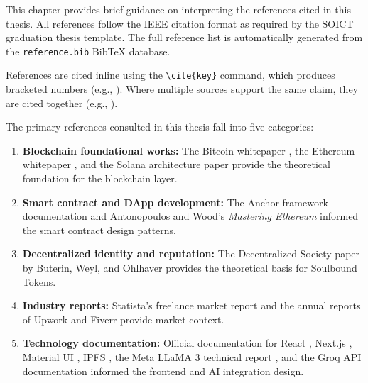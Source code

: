 This chapter provides brief guidance on interpreting the references cited in this thesis. All references follow the IEEE citation format as required by the SOICT graduation thesis template. The full reference list is automatically generated from the \texttt{reference.bib} BibTeX database.

References are cited inline using the \texttt{\textbackslash cite\{key\}} command, which produces bracketed numbers (e.g., \cite{nakamoto2008bitcoin}). Where multiple sources support the same claim, they are cited together (e.g., \cite{buterin2014ethereum, yakovenko2018solana}).

The primary references consulted in this thesis fall into five categories:

\begin{enumerate}
    \item \textbf{Blockchain foundational works:} The Bitcoin whitepaper \cite{nakamoto2008bitcoin}, the Ethereum whitepaper \cite{buterin2014ethereum}, and the Solana architecture paper \cite{yakovenko2018solana} provide the theoretical foundation for the blockchain layer.
    \item \textbf{Smart contract and DApp development:} The Anchor framework documentation \cite{anchor2021} and Antonopoulos and Wood's \textit{Mastering Ethereum} \cite{antonopoulos2018mastering} informed the smart contract design patterns.
    \item \textbf{Decentralized identity and reputation:} The Decentralized Society paper by Buterin, Weyl, and Ohlhaver \cite{weyl2022decentralized} provides the theoretical basis for Soulbound Tokens.
    \item \textbf{Industry reports:} Statista's freelance market report \cite{statista2024freelance} and the annual reports of Upwork \cite{upwork2023} and Fiverr \cite{fiverr2023} provide market context.
    \item \textbf{Technology documentation:} Official documentation for React \cite{react2023}, Next.js \cite{nextjs2023}, Material UI \cite{materialui2023}, IPFS \cite{ipfs2015}, the Meta LLaMA 3 technical report \cite{touvron2023llama}, and the Groq API documentation \cite{groq2024api} informed the frontend and AI integration design.
\end{enumerate}
